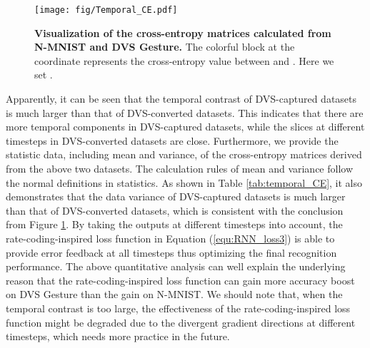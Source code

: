 \documentclass[journal,10pt,twocolumn]{IEEETran}
\begin{document}
\begin{figure}[!htbp]
\centering     
\texttt{[image: fig/Temporal\_CE.pdf]}
\caption{\textbf{Visualization of the cross-entropy matrices calculated from N-MNIST and DVS Gesture.} The colorful block at the coordinate  represents the cross-entropy value between  and . Here we set . } 
\label{fig:temporal_CE} 
\end{figure}

\begin{table}[!htbp]
\caption{Mean and variance of the cross-entropy matrices.}
\label{tab:temporal_CE}
\vspace{2pt}
\centering
\renewcommand\arraystretch{1.3}
\end{table}

Apparently, it can be seen that the temporal contrast of DVS-captured datasets is much larger than that of DVS-converted datasets. This indicates that there are more temporal components in DVS-captured datasets, while the slices at different timesteps in DVS-converted datasets are close. Furthermore, we provide the statistic data, including mean and variance, of the cross-entropy matrices derived from the above two datasets. The calculation rules of mean and variance follow the normal definitions in statistics. As shown in Table \ref{tab:temporal_CE}, it also demonstrates that the data variance of DVS-captured datasets is much larger than that of DVS-converted datasets, which is consistent with the conclusion from Figure \ref{fig:temporal_CE}. By taking the outputs at different timesteps into account, the rate-coding-inspired loss function in Equation (\ref{equ:RNN_loss3}) is able to provide error feedback at all timesteps thus optimizing the final recognition performance. The above quantitative analysis can well explain the underlying reason that the rate-coding-inspired loss function can gain more accuracy boost on DVS Gesture than the gain on N-MNIST. We should note that, when the temporal contrast is too large, the effectiveness of the rate-coding-inspired loss function might be degraded due to the divergent gradient directions at different timesteps, which needs more practice in the future.
\end{document}
